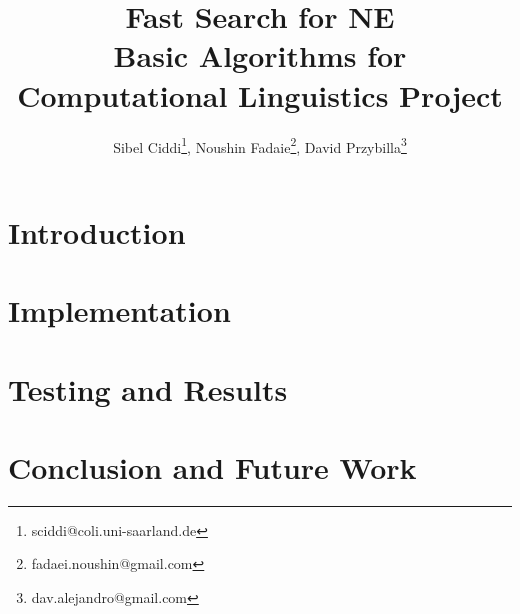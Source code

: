 \documentclass[4pt,a4paper]{article}
\author{Sibel Ciddi\footnote{sciddi@coli.uni-saarland.de},\hspace{5 mm} Noushin Fadaie\footnote{fadaei.noushin@gmail.com},\hspace{5 mm} David Przybilla\footnote{dav.alejandro@gmail.com}}
\title{Fast Search for NE\\Basic Algorithms for Computational Linguistics Project}
\begin{document}
\maketitle


\section{Introduction}
\label{sec:intro}


\section{Implementation}
\label{sec:implementation}


\section{Testing and Results}
\label{sec:results}


\section{Conclusion and Future Work}
\label{sec:conclusion}

\end{document}
